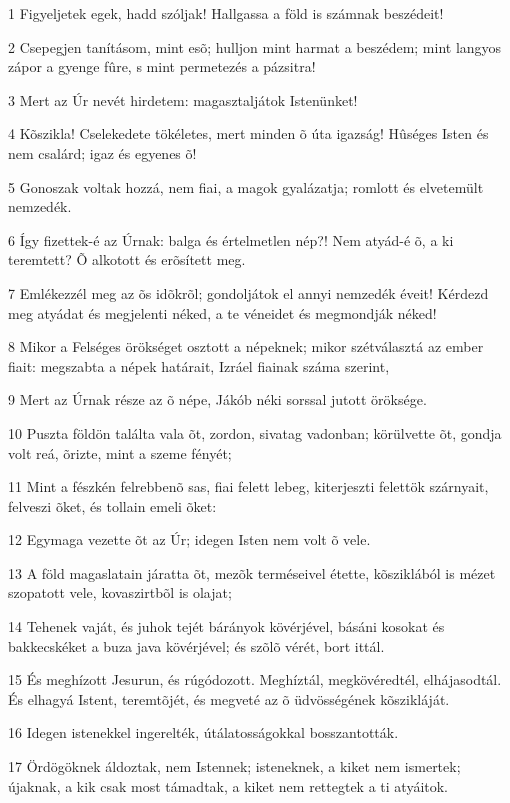 \par 1 Figyeljetek egek, hadd szóljak! Hallgassa a föld is számnak beszédeit!
\par 2 Csepegjen tanításom, mint esõ; hulljon mint harmat a beszédem; mint langyos zápor a gyenge fûre, s mint permetezés a pázsitra!
\par 3 Mert az Úr nevét hirdetem: magasztaljátok Istenünket!
\par 4 Kõszikla! Cselekedete tökéletes, mert minden õ úta igazság! Hûséges Isten és nem csalárd; igaz és egyenes õ!
\par 5 Gonoszak voltak hozzá, nem fiai, a magok gyalázatja; romlott és elvetemült  nemzedék.
\par 6 Így fizettek-é az Úrnak: balga és értelmetlen nép?! Nem atyád-é õ, a ki teremtett? Õ alkotott és erõsített meg.
\par 7 Emlékezzél meg az õs idõkrõl; gondoljátok el annyi nemzedék éveit! Kérdezd meg atyádat és megjelenti néked, a te véneidet és megmondják néked!
\par 8 Mikor a Felséges örökséget osztott a népeknek; mikor szétválasztá az ember fiait: megszabta a népek határait, Izráel fiainak  száma szerint,
\par 9 Mert az Úrnak része az õ népe, Jákób néki sorssal jutott öröksége.
\par 10 Puszta földön találta vala õt, zordon, sivatag vadonban; körülvette õt, gondja volt reá, õrizte, mint a szeme fényét;
\par 11 Mint a fészkén felrebbenõ sas, fiai felett lebeg, kiterjeszti felettök szárnyait, felveszi õket, és tollain emeli õket:
\par 12 Egymaga vezette õt az Úr; idegen Isten nem volt õ vele.
\par 13 A föld magaslatain járatta õt, mezõk terméseivel étette, kõsziklából is mézet szopatott vele, kovaszirtbõl is olajat;
\par 14 Tehenek vaját, és juhok tejét bárányok kövérjével, básáni kosokat és bakkecskéket a buza java kövérjével; és szõlõ vérét, bort ittál.
\par 15 És meghízott Jesurun, és rúgódozott. Meghíztál, megkövéredtél, elhájasodtál. És elhagyá Istent, teremtõjét, és megveté az õ  üdvösségének kõszikláját.
\par 16 Idegen istenekkel ingerelték, útálatosságokkal bosszantották.
\par 17 Ördögöknek áldoztak, nem Istennek; isteneknek, a kiket nem ismertek; újaknak, a kik csak most támadtak, a kiket nem rettegtek a ti atyáitok.
